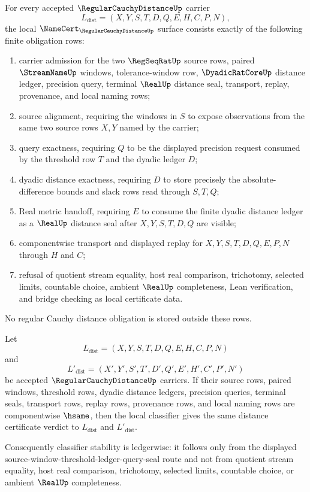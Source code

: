 \begin{theorem}
\label{thm:regular-cauchy-distance-namecert-obligations}
For every accepted $\RegularCauchyDistanceUp$ carrier
$$
L_{\mathrm{dist}}=(X,Y,S,T,D,Q,E,H,C,P,N),
$$
the local $\NameCert_{\RegularCauchyDistanceUp}$ surface consists exactly of the following finite obligation rows:
\begin{enumerate}
\item carrier admission for the two $\RegSeqRatUp$ source rows, paired $\StreamNameUp$ windows, tolerance-window row, $\DyadicRatCoreUp$ distance ledger, precision query, terminal $\RealUp$ distance seal, transport, replay, provenance, and local naming rows;
\item source alignment, requiring the windows in $S$ to expose observations from the same two source rows $X,Y$ named by the carrier;
\item query exactness, requiring $Q$ to be the displayed precision request consumed by the threshold row $T$ and the dyadic ledger $D$;
\item dyadic distance exactness, requiring $D$ to store precisely the absolute-difference bounds and slack rows read through $S,T,Q$;
\item Real metric handoff, requiring $E$ to consume the finite dyadic distance ledger as a $\RealUp$ distance seal after $X,Y,S,T,D,Q$ are visible;
\item componentwise transport and displayed replay for $X,Y,S,T,D,Q,E,P,N$ through $H$ and $C$;
\item refusal of quotient stream equality, host real comparison, trichotomy, selected limits, countable choice, ambient $\RealUp$ completeness, Lean verification, and bridge checking as local certificate data.
\end{enumerate}
No regular Cauchy distance obligation is stored outside these rows.
\end{theorem}

\begin{theorem}
\label{thm:regular-cauchy-distance-classifier-stability}
Let
$$
L_{\mathrm{dist}}=(X,Y,S,T,D,Q,E,H,C,P,N)
$$
and
$$
L'_{\mathrm{dist}}=(X',Y',S',T',D',Q',E',H',C',P',N')
$$
be accepted $\RegularCauchyDistanceUp$ carriers. If their source rows, paired windows, threshold rows, dyadic distance ledgers, precision queries, terminal seals, transport rows, replay rows, provenance rows, and local naming rows are componentwise $\hsame$, then the local classifier gives the same distance certificate verdict to $L_{\mathrm{dist}}$ and $L'_{\mathrm{dist}}$.

Consequently classifier stability is ledgerwise: it follows only from the displayed source-window-threshold-ledger-query-seal route and not from quotient stream equality, host real comparison, trichotomy, selected limits, countable choice, or ambient $\RealUp$ completeness.
\end{theorem}

